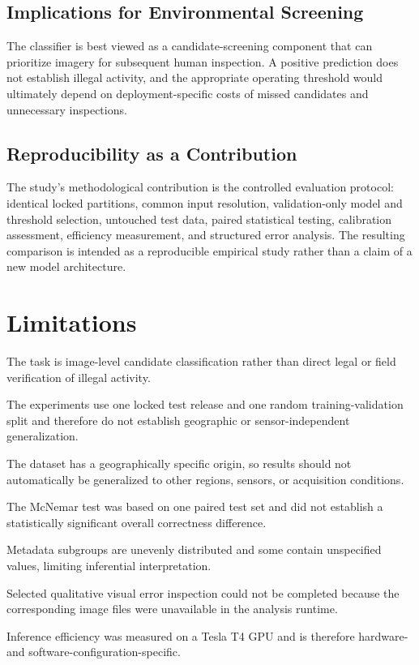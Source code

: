 \documentclass[journal]{IEEEtran}
\begin{document}
\subsection{Implications for Environmental Screening}
The classifier is best viewed as a candidate-screening component that can prioritize imagery for subsequent human inspection. A positive prediction does not establish illegal activity, and the appropriate operating threshold would ultimately depend on deployment-specific costs of missed candidates and unnecessary inspections.

\subsection{Reproducibility as a Contribution}
The study's methodological contribution is the controlled evaluation protocol: identical locked partitions, common input resolution, validation-only model and threshold selection, untouched test data, paired statistical testing, calibration assessment, efficiency measurement, and structured error analysis. The resulting comparison is intended as a reproducible empirical study rather than a claim of a new model architecture.

\section{Limitations}
The task is image-level candidate classification rather than direct legal or field verification of illegal activity.

The experiments use one locked test release and one random training-validation split and therefore do not establish geographic or sensor-independent generalization.

The dataset has a geographically specific origin, so results should not automatically be generalized to other regions, sensors, or acquisition conditions.

The McNemar test was based on one paired test set and did not establish a statistically significant overall correctness difference.

Metadata subgroups are unevenly distributed and some contain unspecified values, limiting inferential interpretation.

Selected qualitative visual error inspection could not be completed because the corresponding image files were unavailable in the analysis runtime.

Inference efficiency was measured on a Tesla T4 GPU and is therefore hardware- and software-configuration-specific.
\end{document}
